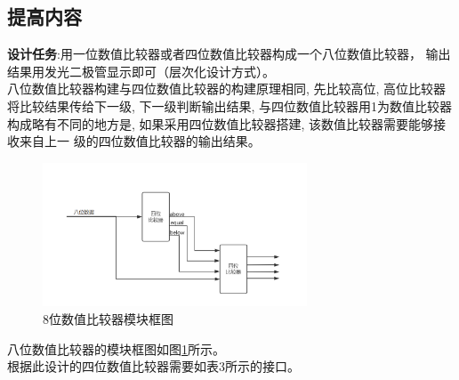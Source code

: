 \documentclass{article}
\begin{document}
\subsection*{提高内容}
\textbf{设计任务}:用一位数值比较器或者四位数值比较器构成一个八位数值比较器，
输出结果用发光二极管显示即可（层次化设计方式）。\\

八位数值比较器构建与四位数值比较器的构建原理相同, 先比较高位, 高位比较器将比较结果传给下一级, 下一级判断输出结果, 
与四位数值比较器用1为数值比较器构成略有不同的地方是, 如果采用四位数值比较器搭建, 该数值比较器需要能够接收来自上一
级的四位数值比较器的输出结果。\\

\begin{figure}[htbp]
    \centering
    \includegraphics[width=0.7\textwidth]{image/2024-06-28-15-19-27.png}
    \caption{8位数值比较器模块框图}
    \label{image_principle_1}
\end{figure}
八位数值比较器的模块框图如图\ref{image_principle_1}所示。\\
根据此设计的四位数值比较器需要如表3所示的接口。
\begin{table}[htp]
    \centering
    \caption{四位数值比较器接口}
\end{table}
\end{document}
